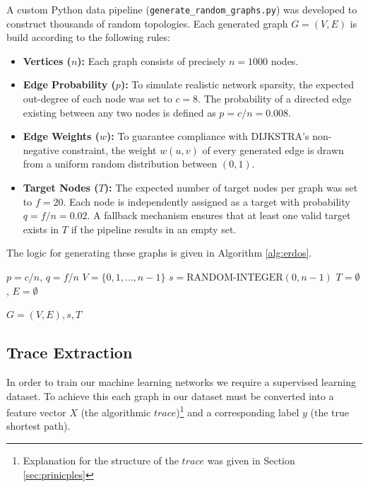 A custom Python data pipeline (\texttt{generate\_random\_graphs.py}) was developed to construct thousands of random topologies. Each generated graph $G=(V,E)$ is build according to the following rules:
\begin{itemize}
    \item \textbf{Vertices ($n$):} Each graph consists of precisely $n = 1000$ nodes.
    \item \textbf{Edge Probability ($p$):} To simulate realistic network sparsity, the expected out-degree of each node was set to $c = 8$. The probability of a directed edge existing between any two nodes is defined as $p = c / n = 0.008$.
    \item \textbf{Edge Weights ($w$):} To guarantee compliance with \textsc{DIJKSTRA}'s non-negative constraint, the weight $w(u,v)$ of every generated edge is drawn from a uniform random distribution between $(0, 1)$.
    \item \textbf{Target Nodes ($T$):} The expected number of target nodes per graph was set to $f = 20$. Each node is independently assigned as a target with probability $q = f / n = 0.02$. A fallback mechanism ensures that at least one valid target exists in $T$ if the pipeline results in an empty set.
\end{itemize}

The logic for generating these graphs is given in Algorithm \ref{alg:erdos}.

\begin{algorithm}[H]
\label{alg:erdos}
\caption{ERDOS-RENYI-GENERATOR ($n, c, f$)}
$p = c / n$, $q = f / n$\;
$V = \{0, 1, \dots, n-1\}$\;
$s = \text{RANDOM-INTEGER}(0, n-1)$\;
$T = \emptyset$, $E = \emptyset$\;


\Return $G=(V, E), s, T$
\end{algorithm}
\newpage

\subsection{Trace Extraction}
\label{subsec:trace_extraction}
In order to train our machine learning networks we require a supervised learning dataset. To achieve this each graph in our dataset must be converted into a feature vector $X$ (the algorithmic $trace$)\footnote{Explanation for the structure of the $trace$ was given in Section \ref{sec:prinicples}} and a corresponding label $y$ (the true shortest path).

